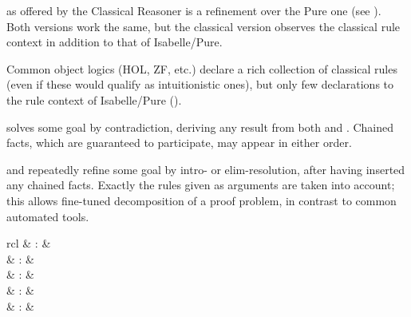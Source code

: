 \begin{isabellebody}
\begin{isamarkuptext}
  \begin{description}

  \item \hyperlink{method.rule}{\mbox{}} as offered by the Classical Reasoner is a
  refinement over the Pure one (see ).  Both
  versions work the same, but the classical version observes the
  classical rule context in addition to that of Isabelle/Pure.

  Common object logics (HOL, ZF, etc.) declare a rich collection of
  classical rules (even if these would qualify as intuitionistic
  ones), but only few declarations to the rule context of
  Isabelle/Pure ().

  \item \hyperlink{method.contradiction}{\mbox{}} solves some goal by contradiction,
  deriving any result from both  and .  Chained
  facts, which are guaranteed to participate, may appear in either
  order.

  \item \hyperlink{method.intro}{\mbox{}} and \hyperlink{method.elim}{\mbox{}} repeatedly refine some goal
  by intro- or elim-resolution, after having inserted any chained
  facts.  Exactly the rules given as arguments are taken into account;
  this allows fine-tuned decomposition of a proof problem, in contrast
  to common automated tools.

  \end{description}%
\end{isamarkuptext}%
\isamarkuptrue%
%
\isamarkuptrue%
%
\begin{isamarkuptext}%
\begin{matharray}{rcl}
    \hypertarget{command.judgment}{\hyperlink{command.judgment}{\mbox{}}} & : &  \\
    \hypertarget{method.atomize}{\hyperlink{method.atomize}{\mbox{}}} & : &  \\
    \hypertarget{attribute.atomize}{\hyperlink{attribute.atomize}{\mbox{}}} & : &  \\
    \hypertarget{attribute.rule-format}{\hyperlink{attribute.rule-format}{\mbox{}}} & : &  \\
    \hypertarget{attribute.rulify}{\hyperlink{attribute.rulify}{\mbox{}}} & : &  \\
  \end{matharray}


\end{isamarkuptext}
\end{isabellebody}
